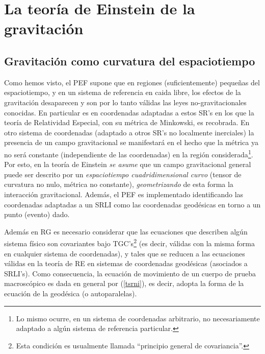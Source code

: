 \chapter{La teoría de Einstein de la gravitación}\label{capTEG}

\section{Gravitación como curvatura del espaciotiempo\label{PE}}

Como hemos visto, el PEF supone que en regiones (suficientemente) pequeñas del espaciotiempo, y en un sistema de referencia en caida libre, los efectos de la gravitación desaparecen y son por lo tanto válidas las leyes no-gravitacionales conocidas. En particular es en coordenadas adaptadas a estos SR's en los que la teoría de Relatividad Especial, con su métrica de Minkowski, es recobrada. En otro sistema de coordenadas (adaptado a otros SR's no localmente inerciales) la presencia de un campo gravitacional se manifestará en el hecho que la métrica ya no será constante (independiente de las coordenadas) en la región considerada\footnote{Lo mismo ocurre, en un sistema de coordenadas arbitrario, no necesariamente adaptado a algún sistema de referencia particular.}. Por esto, en la teoría de Einstein \textit{se asume} que un campo gravitacional general puede ser descrito por un \textit{espaciotiempo cuadridimensional curvo} (tensor de curvatura no nulo, métrica no constante), \textit{geometrizando} de esta forma la interacción gravitacional. Además, el PEF es implementado identificando las coordenadas adaptadas a un SRLI como las coordenadas geodésicas en torno a un punto (evento) dado.

Además en RG es necesario considerar que las ecuaciones que describen algún sistema físico son covariantes bajo TGC's\footnote{Esta condición es usualmente llamada ``principio general de covariancia''.} (es decir, válidas con la misma forma en cualquier sistema de coordenadas), y tales que se reducen a las ecuaciones válidas en la teoría de RE en sistemas de coordenadas geodésicas (asociados a SRLI's). Como consecuencia, la ecuación de movimiento de un cuerpo de prueba macroscópico es dada en general por (\ref{tsrni}), es decir, adopta la forma de la ecuación de la geodésica (o autoparalelas).

